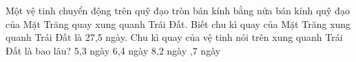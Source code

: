 \begin{ex}
	Một vệ tinh chuyển động trên quỹ đạo tròn bán kính bằng nửa bán kính quỹ đạo của Mặt Trăng quay xung quanh Trái Đất. Biết chu kì quay của Mặt Trăng xung quanh Trái Đất là 27,5 ngày. Chu kì quay của vệ tinh nói trên xung quanh Trái Đất là bao lâu?
	\choice
	{5,3 ngày}
	{6,4 ngày}
	{8,2 ngày}
	{,7 ngày}
\end{ex}
